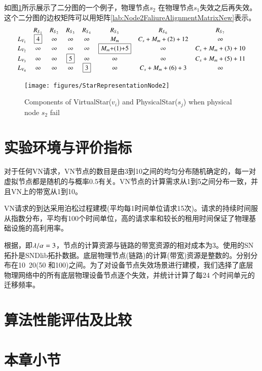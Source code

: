 如图\ref{fig:StarRepresentationNode2}所示展示了二分图的一个例子，物理节点$s_2$ 在物理节点$s_1$失效之后再失效。这个二分图的边权矩阵可以用矩阵\ref{lab:Node2FaliureAlignmentMatrixNew}表示。
\begin{equation*}
\small{
 {\begin{array}{*{20}{c}}
&R_{S_{1}}&R_{S_{2}}&R_{S_3}&R_{S_4}&R_{S_5}&R_{S_6}&R_{S_{7}}\\
{L_{V_1}}&\fbox{4}&\infty&\infty&\infty&M_{m}&C_{s}+M_{m}+(2)+12&\infty\\
L_{V_2}&\infty&\infty&\infty&\infty&\fbox{$M_{m}$+(1)+5}&\infty&C_{s}+M_{m}+(3)+10\\
L_{V_3}&\infty&\infty&\fbox{5}&\infty&\infty&\infty&C_{s}+M_{m}+(5)+11\\
L_{V_4}&\infty&\infty&\infty&\fbox{3}&\infty&C_{s}+M_{m}+(6)+3&\infty\\
\end{array}}
}
\label{lab:Node2FaliureAlignmentMatrixNew}
\end{equation*}

\begin{figure}
\centering
\texttt{[image: figures/StarRepresentationNode2]}\\
  \caption{Components of VirtualStar($v_i$) and PhysicalStar($s_j$) when physical node $s_2$ fail}\label{fig:StarRepresentationNode2}
\end{figure}
\section{实验环境与评价指标}
对于任何VN请求，VN节点的数目是由3到10之间的均匀分布随机确定的，每一对虚拟节点都是随机的与概率0.5有关。VN节点的计算需求从1到5之间分布一致，并且VN上的带宽从1到10。

VN请求的到达采用泊松过程建模(平均每1时间单位请求15次)。请求的持续时间服从指数分布，平均有100个时间单位，高的请求率和较长的租用时间保证了物理基础设施的高利用率。

根据\cite{armbrust2009above,yu2010survivable}，即$\lambda/\alpha=3$，节点的计算资源与链路的带宽资源的相对成本为3。使用的SN 拓扑是SNDlib拓扑数据\cite{orlowski2010sndlib}。底层物理节点(链路)的计算(带宽)资源是整数的。分别分布在10~20(50 和100)之间。为了对设备节点失效场景进行建模，我们选择了底层物理网络中的所有底层物理设备节点逐个失效，并统计计算了每24 个时间单元的迁移频率。


\section{算法性能评估及比较}
\section{本章小节}
